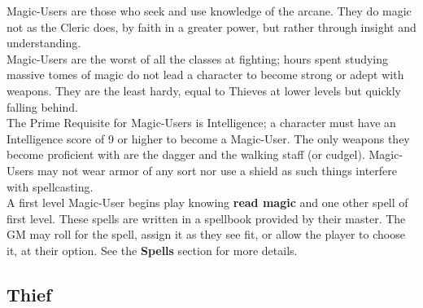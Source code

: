 \documentclass[a4paper,twoside,openany,10pt]{book}
\begin{document}
\begin{multicols}{2}
Magic-Users are those who seek and use knowledge of the arcane. They do magic not as the Cleric does, by faith in a greater power, but rather through insight and understanding.\\

Magic-Users are the worst of all the classes at fighting; hours spent studying massive tomes of magic do not lead a character to become strong or adept with weapons. They are the least hardy, equal to Thieves at lower levels but quickly falling behind.\\

The Prime Requisite for Magic-Users is Intelligence; a character must have an Intelligence score of 9 or higher to become a Magic-User. The only weapons they become proficient with are the dagger and the walking staff (or cudgel). Magic-Users may not wear armor of any sort nor use a shield as such things interfere with spellcasting.\\

A first level Magic-User begins play knowing \textbf{read magic }and one other spell of first level. These spells are written in a spellbook provided by their master. The GM may roll for the spell, assign it as they see fit, or allow the player to choose it, at their option. See the \textbf{Spells} section for more details.\\

\columnbreak

\subsection{Thief}\label{thief}

\addvspace{0.5cm}


\end{multicols}
\end{document}
